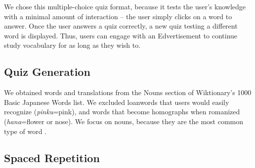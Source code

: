 \documentclass{sigchi}
\begin{document}
We chose this multiple-choice quiz format, because it tests the user's knowledge with a minimal amount of interaction -- the user simply clicks on a word to answer. Once the user answers a quiz correctly, a new quiz testing a different word is displayed. Thus, users can engage with an Edvertisement to continue study vocabulary for as long as they wish to.



 \subsection{Quiz Generation}

We obtained words and translations from the Nouns section of Wiktionary's 1000 Basic Japanese Words list. We excluded loanwords that users would easily recognize (\textit{pinku}=pink), and words that become homographs when romanized (\textit{hana}=flower or nose). We focus on nouns, because they are the most common type of word \cite{microlearning}. %

\pagebreak

\subsection{Spaced Repetition}
\end{document}
